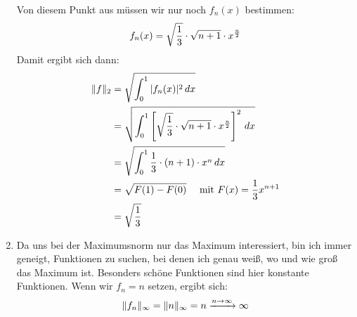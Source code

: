 \documentclass{article}
\begin{document}
\begin{enumerate}[label=(\alph*)]
		Von diesem Punkt aus müssen wir nur noch $f_n(x)$ bestimmen:
		\begin{align}
			f_n(x) = \sqrt{\frac{1}{3}} \cdot \sqrt{n+1} \cdot x^{\frac{n}{2}} \notag
		\end{align}
		Damit ergibt sich dann:
		\begin{align}
			\Vert f\Vert_2 &= \sqrt{\int_0^1 \vert f_n(x)\vert^2 \,dx} \notag \\
			&= \sqrt{\int_0^1 \left[\sqrt{\frac{1}{3}} \cdot \sqrt{n+1} \cdot x^{\frac{n}{2}}\right]^2\,dx} \notag \\
			&= \sqrt{\int_0^1 \frac{1}{3} \cdot (n+1) \cdot x^n \,dx} \notag \\
			&= \sqrt{F(1) - F(0)} \quad\text{ mit } F(x) = \frac{1}{3}x^{n+1} \notag \\
			&= \sqrt{\frac{1}{3}} \notag
		\end{align}
		\item Da uns bei der Maximumsnorm nur das Maximum interessiert, bin ich immer geneigt, Funktionen zu suchen, bei denen ich genau weiß, wo und wie groß das Maximum ist. Besonders schöne Funktionen sind hier konstante Funktionen. Wenn wir $f_n = n$ setzen, ergibt sich:
		\begin{align}
			\Vert f_n\Vert_\infty = \Vert n\Vert_\infty = n \xrightarrow{n \to\infty} \infty \notag
		\end{align}
	\end{enumerate}
\end{document}
